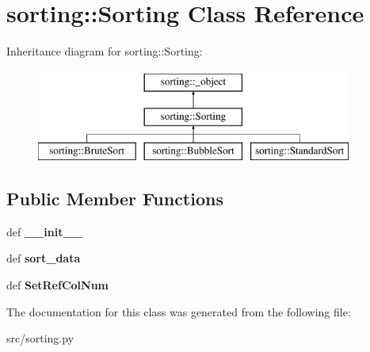 \hypertarget{classsorting_1_1Sorting}{
\section{sorting::Sorting Class Reference}
\label{db/d89/classsorting_1_1Sorting}
}
Inheritance diagram for sorting::Sorting:\begin{figure}[H]
\begin{center}
\leavevmode
\includegraphics[height=3cm]{db/d89/classsorting_1_1Sorting}
\end{center}
\end{figure}
\subsection*{Public Member Functions}
\begin{DoxyCompactItemize}
\item 
\hypertarget{classsorting_1_1Sorting_ae3f7a0a90d9d69fbb89b50ebd19117cc}{
def {\bfseries \_\-\_\-init\_\-\_\-}}
\label{db/d89/classsorting_1_1Sorting_ae3f7a0a90d9d69fbb89b50ebd19117cc}

\item 
\hypertarget{classsorting_1_1Sorting_a3fa59303aa54a66068990af025fff245}{
def {\bfseries sort\_\-data}}
\label{db/d89/classsorting_1_1Sorting_a3fa59303aa54a66068990af025fff245}

\item 
\hypertarget{classsorting_1_1Sorting_a0d3b5cfd6277d7cabaef8b139315ad6d}{
def {\bfseries SetRefColNum}}
\label{db/d89/classsorting_1_1Sorting_a0d3b5cfd6277d7cabaef8b139315ad6d}

\end{DoxyCompactItemize}


The documentation for this class was generated from the following file:\begin{DoxyCompactItemize}
\item 
src/sorting.py\end{DoxyCompactItemize}
